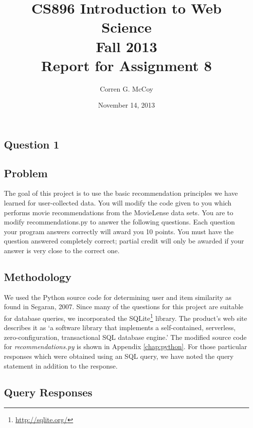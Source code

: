 \documentclass[letterpaper,11pt]{report}
\begin{document}
 
\begin{savenotes}
\pagestyle{plain}
\title{CS896 Introduction to Web Science\\Fall 2013\\Report for Assignment 8}
\author{Corren G. McCoy}
 
\date{November 14, 2013}
\maketitle

\renewcommand*\thesection{\arabic{section}}
\setcounter{section}{0}

\setcounter{tocdepth}{4}
\tableofcontents
 \listoftables
\newpage


\section{Question 1}
\subsection{Problem}The goal of this project is to use the basic recommendation principles we have learned for user-collected data. You will modify the code given to you which performs movie recommendations from the MovieLense data sets. You are to modify recommendations.py to answer the following questions. Each question your program answers correctly will award you 10 points. You must have the question answered completely correct; partial credit will only be awarded if your answer is very close to the correct one.

\subsection{Methodology}We used the Python source code for determining user and item similarity as found in Segaran, 2007\cite{segaran2007programming}. Since many of the questions for this project are suitable for database queries, we incorporated the SQLite\footnote{\url{http://sqlite.org/}} library. The product's web site describes it as `a software library that implements a self-contained, serverless, zero-configuration, transactional SQL database engine.' The modified source code for \emph{recommendations.py} is shown in Appendix \ref{chap:python}. For those particular responses which were obtained using an SQL query, we have noted the query statement in addition to the response.

\subsection{Query Responses}
\begin{enumerate}


\end{enumerate}
\end{savenotes}
\end{document}

